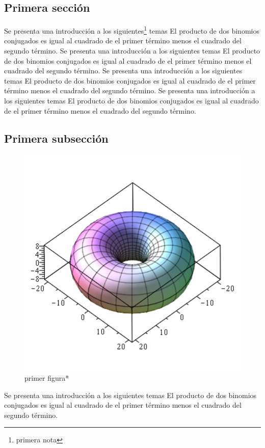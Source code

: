 \documentclass[12pt]{article}
\begin{document}
\begin{multicols}{2}
\section{Primera sección}
Se presenta una introducción a los siguientes\footnote{primera nota} temas El producto de dos binomios conjugados es igual al cuadrado de el primer término menos el cuadrado del segundo término.
Se presenta una introducción a los siguientes temas El producto de dos binomios conjugados es igual al cuadrado de el primer término menos el cuadrado del segundo término.
Se presenta una introducción a los siguientes temas El producto de dos binomios conjugados es igual al cuadrado de el primer término menos el cuadrado del segundo término.
Se presenta una introducción a los siguientes temas El producto de dos binomios conjugados es igual al cuadrado de el primer término menos el cuadrado del segundo término.
\subsection{Primera subsección}
\begin{figure}[ht]
\centering
\includegraphics[scale=0.5]{figuras/fig3d_3}
\caption{primer figura*}
\end{figure}
Se presenta una introducción a los siguientes temas El producto de dos binomios conjugados es igual al cuadrado de el primer término menos el cuadrado del segundo término.

\end{multicols}
\end{document}
